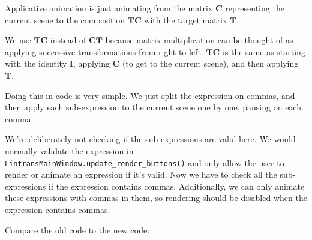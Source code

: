 \documentclass[../development.tex]{subfiles}
\begin{document}
Applicative animation is just animating from the matrix $\mathbf{C}$ representing the current scene to the composition $\mathbf{TC}$ with the target matrix $\mathbf{T}$.

We use $\mathbf{TC}$ instead of $\mathbf{CT}$ because matrix multiplication can be thought of as applying successive transformations from right to left. $\mathbf{TC}$ is the same as starting with the identity $\mathbf{I}$, applying $\mathbf{C}$ (to get to the current scene), and then applying $\mathbf{T}$.

Doing this in code is very simple. We just split the expression on commas, and then apply each sub-expression to the current scene one by one, pausing on each comma.


We're deliberately not checking if the sub-expressions are valid here. We would normally validate the expression in \texttt{LintransMainWindow.update\_render\_buttons()} and only allow the user to render or animate an expression if it's valid. Now we have to check all the sub-expressions if the expression contains commas. Additionally, we can only animate these expressions with commas in them, so rendering should be disabled when the expression contains commas.

Compare the old code to the new code:


\end{document}
